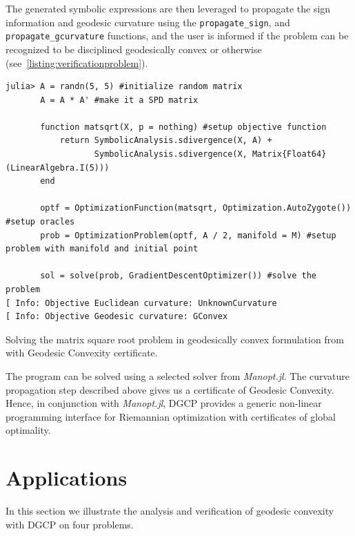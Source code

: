 \documentclass[twoside,11pt]{article}
\begin{document}
The generated symbolic expressions are then leveraged to propagate the sign information and geodesic curvature using the \texttt{propagate\_sign}, and \texttt{propagate\_gcurvature} functions, and the user is informed if the problem can be recognized to be disciplined geodesically convex or otherwise (see~\ref{listing:verificationproblem}).
%
\begin{listing}[hbt!]
\begin{verbatim}
julia> A = randn(5, 5) #initialize random matrix
       A = A * A' #make it a SPD matrix

       function matsqrt(X, p = nothing) #setup objective function
           return SymbolicAnalysis.sdivergence(X, A) +
                  SymbolicAnalysis.sdivergence(X, Matrix{Float64}(LinearAlgebra.I(5)))
       end

       optf = OptimizationFunction(matsqrt, Optimization.AutoZygote()) #setup oracles
       prob = OptimizationProblem(optf, A / 2, manifold = M) #setup problem with manifold and initial point

       sol = solve(prob, GradientDescentOptimizer()) #solve the problem
[ Info: Objective Euclidean curvature: UnknownCurvature
[ Info: Objective Geodesic curvature: GConvex
\end{verbatim}
\caption{Solving the matrix square root problem in geodesically convex formulation from \citep{sra2015matrix} with Geodesic Convexity certificate.}
\end{listing}\label{listing:verificationproblem}
%
The program can be solved using a selected solver from \textsl{Manopt.jl}. The curvature propagation step described above gives us a certificate of Geodesic Convexity. Hence, in conjunction with \textsl{Manopt.jl}, DGCP provides a generic non-linear programming interface for Riemannian optimization with certificates of global optimality. %


\section{Applications}
In this section we illustrate the analysis and verification of geodesic convexity with DGCP on four problems.
\end{document}
